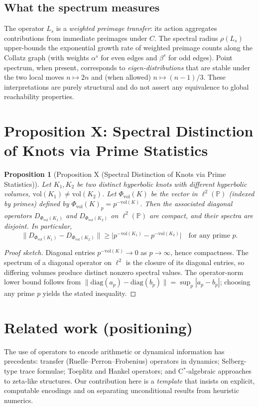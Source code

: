 \documentclass[11pt]{article}
\newtheorem{proposition}[theorem]{Proposition}
\theoremstyle{definition}
\theoremstyle{remark}
\newcommand{\PP}{\mathbb{P}} %
\newcommand{\1}{\mathbf{1}}
\begin{document}
\subsection*{What the spectrum measures}
The operator \(L_s\) is a \emph{weighted preimage transfer}: its action aggregates contributions from immediate preimages under \(C\).
The spectral radius \(\rho(L_s)\) upper-bounds the exponential growth rate of weighted preimage counts along the Collatz graph
(with weights \(\alpha^{s}\) for even edges and \(\beta^{s}\) for odd edges).
Point spectrum, when present, corresponds to \emph{eigen-distributions} that are stable under the two local moves
\(n\mapsto 2n\) and (when allowed) \(n\mapsto (n-1)/3\).
These interpretations are purely structural and do not assert any equivalence to global reachability properties.

\section*{Proposition X: Spectral Distinction of Knots via Prime Statistics}
\begin{proposition}[Proposition X (Spectral Distinction of Knots via Prime Statistics)]\label{prop:X}
Let \(K_1, K_2\) be two distinct hyperbolic knots with different hyperbolic volumes, \(\mathrm{vol}(K_1) \neq \mathrm{vol}(K_2)\). Let \(\Phi_{\mathrm{vol}}(K)\) be the vector in \(\ell^2(\PP)\) (indexed by primes) defined by \(\Phi_{\mathrm{vol}}(K)_p = p^{-\mathrm{vol}(K)}\). Then the associated diagonal operators \(D_{\Phi_{\mathrm{vol}}(K_1)}\) and \(D_{\Phi_{\mathrm{vol}}(K_2)}\) on \(\ell^2(\PP)\) are compact, and their spectra are disjoint. In particular,
\[
\big\|D_{\Phi_{\mathrm{vol}}(K_1)} - D_{\Phi_{\mathrm{vol}}(K_2)}\big\| \ge \big|p^{-\mathrm{vol}(K_1)} - p^{-\mathrm{vol}(K_2)}\big| \quad \text{for any prime } p.
\]
\end{proposition}
\begin{proof}[Proof sketch]
Diagonal entries \(p^{-\mathrm{vol}(K)}\to 0\) as \(p\to\infty\), hence compactness. The spectrum of a diagonal operator on \(\ell^2\) is the closure of its diagonal entries, so differing volumes produce distinct nonzero spectral values. The operator-norm lower bound follows from \(\|\mathrm{diag}(a_p)-\mathrm{diag}(b_p)\|=\sup_p |a_p-b_p|\); choosing any prime \(p\) yields the stated inequality.
\end{proof}

\section{Related work (positioning)}
The use of operators to encode arithmetic or dynamical information has precedents: transfer (Ruelle--Perron--Frobenius) operators in dynamics; Selberg-type trace formulae; Toeplitz and Hankel operators; and C$^*$-algebraic approaches to zeta-like structures. Our contribution here is a \emph{template} that insists on explicit, computable encodings and on separating unconditional results from heuristic numerics.
\end{document}

